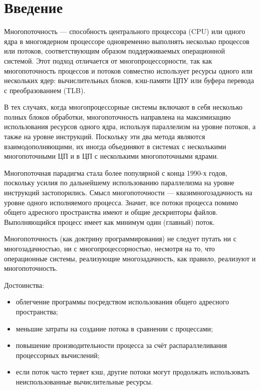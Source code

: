 \chapter*{Введение}

Многопоточность — способность центрального процессора (CPU) или одного ядра в многоядерном процессоре одновременно выполнять несколько процессов или потоков, соответствующим образом поддерживаемых операционной системой.
Этот подход отличается от многопроцессорности, так как многопоточность процессов и потоков совместно использует ресурсы одного или нескольких ядер: вычислительных блоков, кэш-памяти ЦПУ или буфера перевода с преобразованием (TLB).

В тех случаях, когда многопроцессорные системы включают в себя несколько полных блоков обработки, многопоточность направлена на максимизацию использования ресурсов одного ядра, используя параллелизм на уровне потоков, а также на уровне инструкций.
Поскольку эти два метода являются взаимодополняющими, их иногда объединяют в системах с несколькими многопоточными ЦП и в ЦП с несколькими многопоточными ядрами.

Многопоточная парадигма стала более популярной с конца 1990-х годов, поскольку усилия по дальнейшему использованию параллелизма на уровне инструкций застопорились.
Смысл многопоточности — квазимногозадачность на уровне одного исполняемого процесса.
Значит, все потоки процесса помимо общего адресного пространства имеют и общие дескрипторы файлов. Выполняющийся процесс имеет как минимум один (главный) поток.

Многопоточность (как доктрину программирования) не следует путать ни с многозадачностью, ни с многопроцессорностью, несмотря на то, что операционные системы, реализующие многозадачность, как правило, реализуют и многопоточность.

Достоинства:
\begin{itemize}
	\item облегчение программы посредством использования общего адресного пространства;
	\item меньшие затраты на создание потока в сравнении с процессами;
	\item повышение производительности процесса за счёт распараллеливания процессорных вычислений;
	\item если поток часто теряет кэш, другие потоки могут продолжать использовать неиспользованные вычислительные ресурсы.
\end{itemize}

